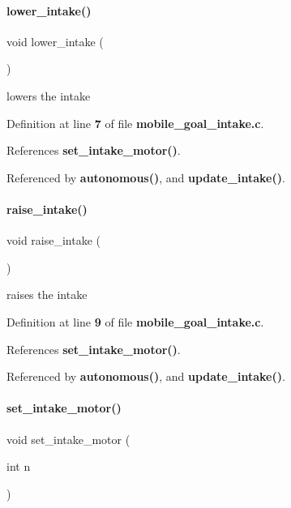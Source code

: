 \paragraph{lower\+\_\+intake()}
{\footnotesize\ttfamily void lower\+\_\+intake (\begin{DoxyParamCaption}{ }\end{DoxyParamCaption})}



lowers the intake 



Definition at line \textbf{ 7} of file \textbf{ mobile\+\_\+goal\+\_\+intake.\+c}.



References \textbf{ set\+\_\+intake\+\_\+motor()}.



Referenced by \textbf{ autonomous()}, and \textbf{ update\+\_\+intake()}.

\mbox{\label{mobile__goal__intake_8h_aa46a9341d1eb7b39a2ef4cc5079ee3ca}} 
\paragraph{raise\+\_\+intake()}
{\footnotesize\ttfamily void raise\+\_\+intake (\begin{DoxyParamCaption}{ }\end{DoxyParamCaption})}



raises the intake 



Definition at line \textbf{ 9} of file \textbf{ mobile\+\_\+goal\+\_\+intake.\+c}.



References \textbf{ set\+\_\+intake\+\_\+motor()}.



Referenced by \textbf{ autonomous()}, and \textbf{ update\+\_\+intake()}.

\mbox{\label{mobile__goal__intake_8h_ab31e12bb0fa46c77906a048666b699d5}} 
\paragraph{set\+\_\+intake\+\_\+motor()}
{\footnotesize\ttfamily void set\+\_\+intake\+\_\+motor (\begin{DoxyParamCaption}\item[{int}]{n }\end{DoxyParamCaption})}



